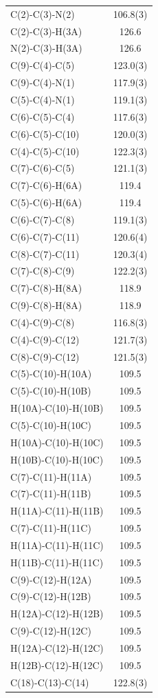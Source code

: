 \begin{center}
{\begin{supertabular}{p{1.5in}c}
C(2)-C(3)-N(2)&106.8(3)\\
C(2)-C(3)-H(3A)&126.6\\
N(2)-C(3)-H(3A)&126.6\\
C(9)-C(4)-C(5)&123.0(3)\\
C(9)-C(4)-N(1)&117.9(3)\\
C(5)-C(4)-N(1)&119.1(3)\\
C(6)-C(5)-C(4)&117.6(3)\\
C(6)-C(5)-C(10)&120.0(3)\\
C(4)-C(5)-C(10)&122.3(3)\\
C(7)-C(6)-C(5)&121.1(3)\\
C(7)-C(6)-H(6A)&119.4\\
C(5)-C(6)-H(6A)&119.4\\
C(6)-C(7)-C(8)&119.1(3)\\
C(6)-C(7)-C(11)&120.6(4)\\
C(8)-C(7)-C(11)&120.3(4)\\
C(7)-C(8)-C(9)&122.2(3)\\
C(7)-C(8)-H(8A)&118.9\\
C(9)-C(8)-H(8A)&118.9\\
C(4)-C(9)-C(8)&116.8(3)\\
C(4)-C(9)-C(12)&121.7(3)\\
C(8)-C(9)-C(12)&121.5(3)\\
C(5)-C(10)-H(10A)&109.5\\
C(5)-C(10)-H(10B)&109.5\\
H(10A)-C(10)-H(10B)&109.5\\
C(5)-C(10)-H(10C)&109.5\\
H(10A)-C(10)-H(10C)&109.5\\
H(10B)-C(10)-H(10C)&109.5\\
C(7)-C(11)-H(11A)&109.5\\
C(7)-C(11)-H(11B)&109.5\\
H(11A)-C(11)-H(11B)&109.5\\
C(7)-C(11)-H(11C)&109.5\\
H(11A)-C(11)-H(11C)&109.5\\
H(11B)-C(11)-H(11C)&109.5\\
C(9)-C(12)-H(12A)&109.5\\
C(9)-C(12)-H(12B)&109.5\\
H(12A)-C(12)-H(12B)&109.5\\
C(9)-C(12)-H(12C)&109.5\\
H(12A)-C(12)-H(12C)&109.5\\
H(12B)-C(12)-H(12C)&109.5\\
C(18)-C(13)-C(14)&122.8(3)\\

\end{supertabular}}
\end{center}
